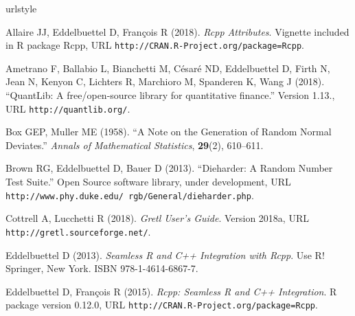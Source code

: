 \begin{thebibliography}{14}
\newcommand{\enquote}[1]{``#1''}
\providecommand{\natexlab}[1]{#1}
\providecommand{\url}[1]{\texttt{#1}}
\providecommand{\urlprefix}{URL }
\expandafter\ifx\csname urlstyle\endcsname\relax
  \providecommand{\doi}[1]{doi:\discretionary{}{}{}#1}\else
  \providecommand{\doi}{doi:\discretionary{}{}{}\begingroup
  \urlstyle{rm}\Url}\fi
\providecommand{\eprint}[2][]{\url{#2}}

Allaire JJ, Eddelbuettel D, Fran\c{c}ois R (2018).
\newblock \emph{{Rcpp} Attributes}.
\newblock Vignette included in R package Rcpp,
  \urlprefix\url{http://CRAN.R-Project.org/package=Rcpp}.

Ametrano F, Ballabio L, Bianchetti M, C\'{e}sar\'{e} ND, Eddelbuettel D, Firth
  N, Jean N, Kenyon C, Lichters R, Marchioro M, Spanderen K, Wang J (2018).
\newblock \enquote{QuantLib: A free/open-source library for quantitative
  finance.}
\newblock Version 1.13., \urlprefix\url{http://quantlib.org/}.

Box GEP, Muller ME (1958).
\newblock \enquote{A Note on the Generation of Random Normal Deviates.}
\newblock \emph{Annals of Mathematical Statistics}, \textbf{29}(2), 610--611.

Brown RG, Eddelbuettel D, Bauer D (2013).
\newblock \enquote{Dieharder: A Random Number Test Suite.}
\newblock Open Source software library, under development,
  \urlprefix\url{http://www.phy.duke.edu/~rgb/General/dieharder.php}.

Cottrell A, Lucchetti R (2018).
\newblock \emph{Gretl User's Guide}.
\newblock Version 2018a, \urlprefix\url{http://gretl.sourceforge.net/}.

Eddelbuettel D (2013).
\newblock \emph{Seamless R and C++ Integration with Rcpp}.
\newblock Use R! Springer, New York.
\newblock ISBN 978-1-4614-6867-7.

Eddelbuettel D, Fran\c{c}ois R (2015).
\newblock \emph{{Rcpp}: Seamless {R} and {C++} Integration}.
\newblock R package version 0.12.0,
  \urlprefix\url{http://CRAN.R-Project.org/package=Rcpp}.


\end{thebibliography}
